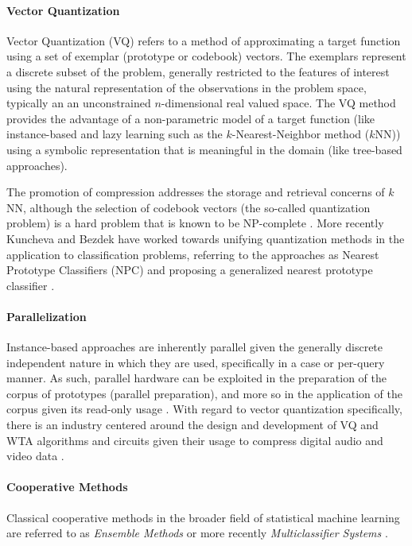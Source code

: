 \paragraph{Vector Quantization}
Vector Quantization (VQ) refers to a method of approximating a target function using a set of exemplar (prototype or codebook) vectors. The exemplars represent a discrete subset of the problem, generally restricted to the features of interest using the natural representation of the observations in the problem space, typically an an unconstrained $n$-dimensional real valued space. The VQ method provides the advantage of a non-parametric model of a target function (like instance-based and lazy learning such as the $k$-Nearest-Neighbor method ($k$NN)) using a symbolic representation that is meaningful in the domain (like tree-based approaches). 

The promotion of compression addresses the storage and retrieval concerns of $k$NN, although the selection of codebook vectors (the so-called quantization problem) is a hard problem that is known to be NP-complete \cite{Garey1982}. More recently Kuncheva and Bezdek have worked towards unifying quantization methods in the application to classification problems, referring to the approaches as Nearest Prototype Classifiers (NPC) and proposing a generalized nearest prototype classifier \cite{Kuncheva1998, Kuncheva1998a}.
	
\paragraph{Parallelization} 
Instance-based approaches are inherently parallel given the generally discrete independent nature in which they are used, specifically in a case or per-query manner. As such, parallel hardware can be exploited in the preparation of the corpus of prototypes (parallel preparation), and more so in the application of the corpus given its read-only usage \cite{Aamodt1994, Nagendra1996, Plaza1997}. With regard to vector quantization specifically, there is an industry centered around the design and development of VQ and WTA algorithms and circuits given their usage to compress digital audio and video data \cite{Nakada1999, Parhi1994}.
	
\paragraph{Cooperative Methods}
Classical cooperative methods in the broader field of statistical machine learning are referred to as \emph{Ensemble Methods} \cite{Opitz1999, Polikar2006} or more recently \emph{Multiclassifier Systems} \cite{Ghosh2002}. 

